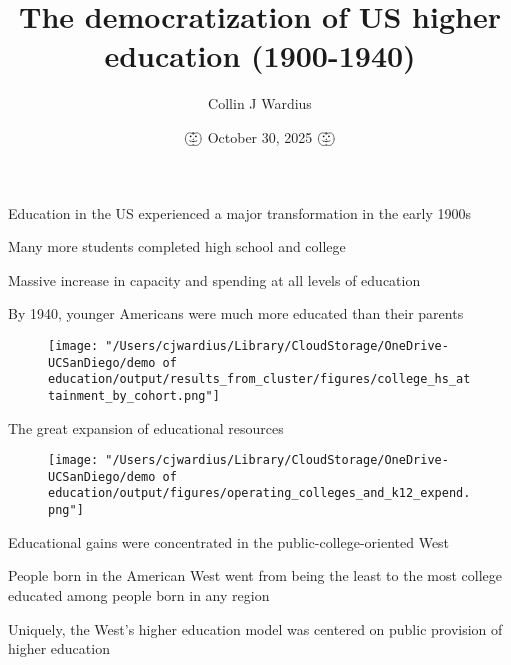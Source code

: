 \documentclass[notes,11pt, aspectratio=169]{beamer}
\title[]{The democratization of US higher education (1900-1940)}
\author{Collin J Wardius} %
\institute{
  Department of Economics, UC San Diego
  \newline
  Read by Fabian E, Gaurav, and Julian
}
\date[]{$\bigpumpkin$ October 30, 2025 $\bigpumpkin$}
\newenvironment{wideitemize}{\itemize\addtolength{\itemsep}{10pt}}{\enditemize}
\begin{document}
\begin{frame}
  \titlepage
\end{frame}

\begin{frame}{Education in the US experienced a major transformation in the early 1900s}
 \begin{wideitemize}
\item Many more students completed high school and college
\item Massive increase in capacity and spending at all levels of education
\end{wideitemize}
\end{frame}

\begin{frame}{By 1940, younger Americans were much more educated than their parents}
  \begin{figure}
        \centering
        \texttt{[image: "/Users/cjwardius/Library/CloudStorage/OneDrive-UCSanDiego/demo of education/output/results\_from\_cluster/figures/college\_hs\_attainment\_by\_cohort.png"]}
    \end{figure}
\end{frame}

\begin{frame}{The great expansion of educational resources}
  \begin{figure}
        \centering
        \texttt{[image: "/Users/cjwardius/Library/CloudStorage/OneDrive-UCSanDiego/demo of education/output/figures/operating\_colleges\_and\_k12\_expend.png"]}
    \end{figure}
\end{frame}

\begin{frame}{Educational gains were concentrated in the public-college-oriented West}
  \begin{wideitemize}
    \item People born in the American West went from being the least to the most college educated among people born in any region
    \item Uniquely, the West's higher education model was centered on public provision of higher education
  \end{wideitemize}
\end{frame}
\end{document}
